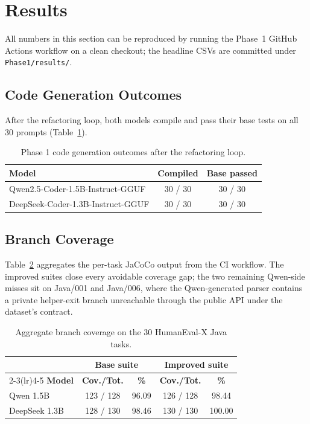 \documentclass[journal]{IEEEtran}
\begin{document}
\section{Results}\label{sec:results}

All numbers in this section can be reproduced by running the Phase~1
GitHub Actions workflow on a clean checkout; the headline CSVs are
committed under \texttt{Phase1/results/}.

\subsection{Code Generation Outcomes}

After the refactoring loop, both models compile and pass their base tests
on all 30 prompts (Table~\ref{tab:codegen}).

\begin{table}[!t]
\renewcommand{\arraystretch}{1.15}
\caption{Phase 1 code generation outcomes after the refactoring loop.}
\label{tab:codegen}
\centering
\footnotesize
\begin{tabular}{@{}lcc@{}}
\toprule
\textbf{Model} & \textbf{Compiled} & \textbf{Base passed} \\
\midrule
Qwen2.5-Coder-1.5B-Instruct-GGUF    & 30 / 30 & 30 / 30 \\
DeepSeek-Coder-1.3B-Instruct-GGUF   & 30 / 30 & 30 / 30 \\
\bottomrule
\end{tabular}
\end{table}

\subsection{Branch Coverage}

Table~\ref{tab:cov} aggregates the per-task JaCoCo output from the CI
workflow. The improved suites close every avoidable coverage gap; the two
remaining Qwen-side misses sit on Java/001 and Java/006, where the
Qwen-generated parser contains a private helper-exit branch unreachable
through the public API under the dataset's contract.

\begin{table}[!t]
\renewcommand{\arraystretch}{1.15}
\caption{Aggregate branch coverage on the 30 HumanEval-X Java tasks.}
\label{tab:cov}
\centering
\footnotesize
\begin{tabular}{@{}lcccc@{}}
\toprule
& \multicolumn{2}{c}{\textbf{Base suite}} & \multicolumn{2}{c}{\textbf{Improved suite}} \\
\cmidrule(lr){2-3}\cmidrule(lr){4-5}
\textbf{Model}    & \textbf{Cov./Tot.} & \textbf{\%} & \textbf{Cov./Tot.} & \textbf{\%} \\
\midrule
Qwen 1.5B    & 123 / 128 & 96.09 & 126 / 128 &  98.44 \\
DeepSeek 1.3B & 128 / 130 & 98.46 & 130 / 130 & 100.00 \\
\bottomrule
\end{tabular}
\end{table}
\end{document}

